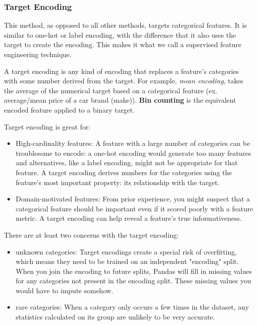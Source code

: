 \documentclass[12pt]{report}
\begin{document}
\subsubsection{Target Encoding}

This method, as opposed to all other methods, targets categorical features. It is similar to one-hot or label encoding, with the difference that it also uses the target to create the encoding. This makes it what we call a supervised feature engineering technique.

A target encoding is any kind of encoding that replaces a feature's categories with some number derived from the target. For example, \textit{mean encoding}, takes the average of the numerical target based on a categorical feature (ex. average/mean price of a car brand (make)). \textbf{Bin counting} is the equivalent encoded feature applied to a binary target.


Target encoding is great for:
\begin{itemize}
  \item High-cardinality features: A feature with a large number of categories can be troublesome to encode: a one-hot encoding would generate too many features and alternatives, like a label encoding, might not be appropriate for that feature. A target encoding derives numbers for the categories using the feature's most important property: its relationship with the target.
  \item Domain-motivated features: From prior experience, you might suspect that a categorical feature should be important even if it scored poorly with a feature metric. A target encoding can help reveal a feature's true informativeness.
\end{itemize}



There are at least two concerns with the target encoding:
\begin{itemize}
  \item unknown categories: Target encodings create a special risk of overfitting, which means they need to be trained on an independent "encoding" split. When you join the encoding to future splits, Pandas will fill in missing values for any categories not present in the encoding split. These missing values you would have to impute somehow.
  \item rare categories: When a category only occurs a few times in the dataset, any statistics calculated on its group are unlikely to be very accurate.
\end{itemize}
\end{document}
